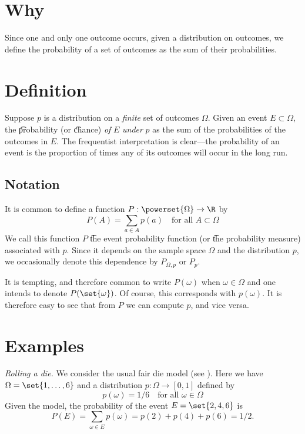 
\section*{Why}

Since one and only one outcome occurs, given a distribution on outcomes, we define the probability of a set of outcomes as the sum of their probabilities.

\section*{Definition}

Suppose $p$ is a distribution on a \textit{finite} set of outcomes $\Omega $.
Given an event $E \subset \Omega $, the \t{probability} (or \t{chance}) \textit{of} $E$ \textit{under} $p$ as the sum of the probabilities of the outcomes in $E$.
The frequentist interpretation is clear---the probability of an event is the proportion of times any of its outcomes will occur in the long run.

\subsection*{Notation}

It is common to define a function $P: \powerset{\Omega } \to \R $ by
\[
P(A) = \sum_{a \in A} p(a) \quad \text{for all } A \subset \Omega
\]
We call this function $P$ \t{the event probability function} (or \t{the probability measure}) associated with $p$.
Since it depends on the sample space $\Omega $ and the distribution $p$, we occasionally denote this dependence by $P_{\Omega , p}$ or $P_p$.

It is tempting, and therefore common to write $P(\omega )$ when $\omega  \in \Omega $ and one intends to denote $P(\set{\omega })$.
Of course, this corresponds with $p(\omega )$.
It is therefore easy to see that from $P$ we can compute $p$, and vice versa.

\section*{Examples}

\textit{Rolling a die.}
We consider the usual fair die model (see ).
Here we have $\Omega  = \set{1, \dots , 6}$ and a distribution $p: \Omega  \to [0,1]$ defined by
\[
p(\omega ) = 1/6 \quad \text{for all } \omega  \in \Omega
\]
Given the model, the probability of the event $E = \set{2, 4, 6}$ is
\[
\textstyle
P(E) = \sum_{\omega  \in E} p(\omega ) = p(2) + p(4) + p(6) = 1/2.
\]

